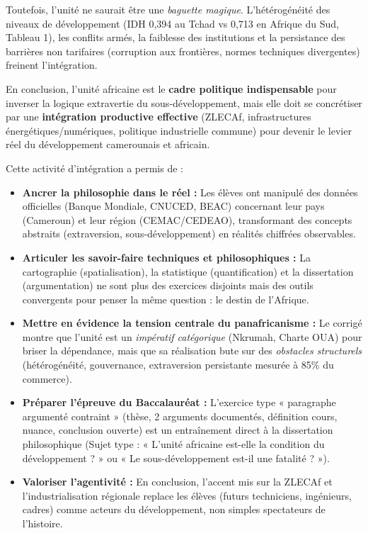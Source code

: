 \documentclass[11pt]{article}
\newcounter{popsec}
\newcounter{popsub}
\newcommand{\courssub}[1]{%
  \stepcounter{popsub}%
  \par\vspace{9pt}\noindent{\popxbold\fontsize{11.5}{13}\selectfont\color{popink}{\color{poporange}\thepopsec.\thepopsub}\hspace{6pt}#1}\par\nopagebreak\vspace{4pt}
}
\begin{document}
\begin{exoresolu}
Toutefois, l'unité ne saurait être une \emph{baguette magique}. L'hétérogénéité des niveaux de développement (IDH 0,394 au Tchad vs 0,713 en Afrique du Sud, Tableau 1), les conflits armés, la faiblesse des institutions et la persistance des barrières non tarifaires (corruption aux frontières, normes techniques divergentes) freinent l'intégration. 

En conclusion, l'unité africaine est le \textbf{cadre politique indispensable} pour inverser la logique extravertie du sous-développement, mais elle doit se concrétiser par une \textbf{intégration productive effective} (ZLECAf, infrastructures énergétiques/numériques, politique industrielle commune) pour devenir le levier réel du développement camerounais et africain.
\end{exoresolu}

\courssub{Bilan de l'activité}
Cette activité d'intégration a permis de :
\begin{itemize}
    \item \textbf{Ancrer la philosophie dans le réel :} Les élèves ont manipulé des données officielles (Banque Mondiale, CNUCED, BEAC) concernant leur pays (Cameroun) et leur région (CEMAC/CEDEAO), transformant des concepts abstraits (extraversion, sous-développement) en réalités chiffrées observables.
    \item \textbf{Articuler les savoir-faire techniques et philosophiques :} La cartographie (spatialisation), la statistique (quantification) et la dissertation (argumentation) ne sont plus des exercices disjoints mais des outils convergents pour penser la même question : le destin de l'Afrique.
    \item \textbf{Mettre en évidence la tension centrale du panafricanisme :} Le corrigé montre que l'unité est un \emph{impératif catégorique} (Nkrumah, Charte OUA) pour briser la dépendance, mais que sa réalisation bute sur des \emph{obstacles structurels} (hétérogénéité, gouvernance, extraversion persistante mesurée à 85\% du commerce).
    \item \textbf{Préparer l'épreuve du Baccalauréat :} L'exercice type « paragraphe argumenté contraint » (thèse, 2 arguments documentés, définition cours, nuance, conclusion ouverte) est un entraînement direct à la dissertation philosophique (Sujet type : « L'unité africaine est-elle la condition du développement ? » ou « Le sous-développement est-il une fatalité ? »).
    \item \textbf{Valoriser l'agentivité :} En conclusion, l'accent mis sur la ZLECAf et l'industrialisation régionale replace les élèves (futurs techniciens, ingénieurs, cadres) comme acteurs du développement, non simples spectateurs de l'histoire.
\end{itemize}
\end{document}
